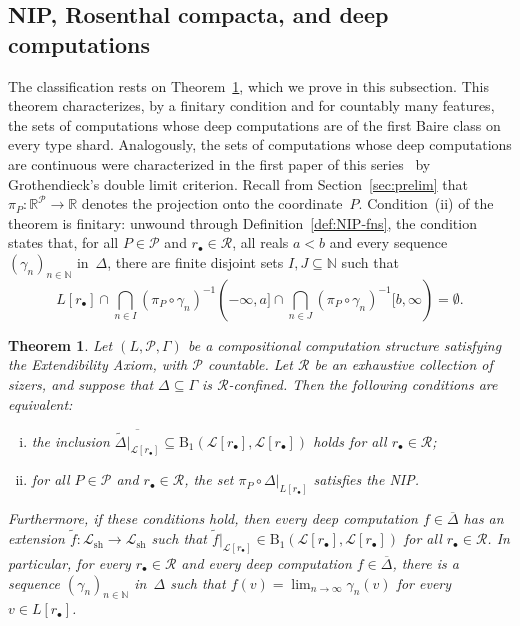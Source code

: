 \documentclass[psamsfonts]{amsart}
\newtheorem{thm}{Theorem}[section]
\theoremstyle{definition}
\theoremstyle{remark}
\newcommand{\sh}{\text{sh}}
\numberwithin{equation}{section}
\begin{document}
\subsection{NIP, Rosenthal compacta, and deep computations}

The classification rests on Theorem~\ref{thm:nip-baire1def}, which we prove in this subsection.
This theorem characterizes, by a finitary condition and for countably many features, the sets of computations whose deep computations are of the first Baire class on every type shard.
Analogously, the sets of computations whose deep computations are continuous were characterized in the first paper of this series~\cite{alva2024approximability} by Grothendieck’s double limit criterion.
Recall from Section~\ref{sec:prelim} that $\pi_P\colon\mathbb{R}^{\mathcal{P}}\to\mathbb{R}$ denotes the projection onto the coordinate~$P$.
Condition~(ii) of the theorem is finitary: unwound through Definition~\ref{def:NIP-fns}, the condition states that, for all $P\in\mathcal{P}$ and $r_\bullet\in \mathscr{R}$, all reals $a<b$ and every sequence $(\gamma_n)_{n\in\mathbb{N}}$ in~$\Delta$, there are finite disjoint sets $I,J\subseteq\mathbb{N}$ such that
\[
  L[r_\bullet]\cap\bigcap_{n\in I}(\pi_P\circ\gamma_n)^{-1}(-\infty,a]\cap\bigcap_{n\in J}(\pi_P\circ\gamma_n)^{-1}[b,\infty)=\emptyset.
\]

\begin{thm}\label{thm:nip-baire1def}
  Let $(L,\mathcal{P},\Gamma)$ be a compositional computation structure satisfying the Extendibility Axiom, with $\mathcal{P}$ countable.
  Let $\mathscr{R}$ be an exhaustive collection of sizers,
  and suppose that $\Delta\subseteq\Gamma$ is $\mathscr{R}$-confined.
  Then the following conditions are equivalent:

  \begin{enumerate}[(i)]
  \item
    the inclusion $\overline{\tilde\Delta|_{\mathcal{L}[r_\bullet]}}\subseteq \mathrm{B}_1(\mathcal{L}[r_\bullet],\mathcal{L}[r_\bullet])$ holds for all $r_\bullet\in \mathscr{R}$;
  \item
    for all $P\in\mathcal{P}$ and $r_\bullet\in \mathscr{R}$, the set $\pi_P\circ \Delta|_{L[r_\bullet]}$ satisfies the NIP.
  \end{enumerate}

  Furthermore, if these conditions hold, then every deep computation $f\in\overline{\Delta}$ has an extension $\tilde f\colon\mathcal{L}_{\sh}\to \mathcal{L}_{\sh}$ such that $\tilde f|_{\mathcal{L}[r_\bullet]}\in \mathrm{B}_1(\mathcal{L}[r_\bullet],\mathcal{L}[r_\bullet])$ for all $r_{\bullet}\in \mathscr{R}$.
  In particular, for every $r_\bullet\in\mathscr{R}$ and every deep computation $f\in\overline{\Delta}$, there is a sequence $(\gamma_n)_{n\in\mathbb{N}}$ in~$\Delta$ such that $f(v)=\lim_{n\to\infty}\gamma_n(v)$ for every $v\in L[r_\bullet]$.
\end{thm}
\end{document}
